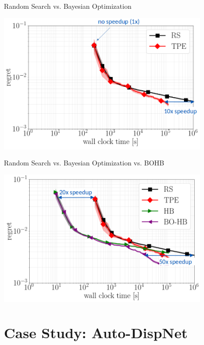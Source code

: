 \begin{frame}[c,fragile]{Random Search vs. Bayesian Optimization}

\centering
\includegraphics[width=0.8\textwidth]{images/randomsearch_bo}

\end{frame}
\begin{frame}[c,fragile]{Random Search vs. Bayesian Optimization vs. BOHB}

\centering
\includegraphics[width=0.8\textwidth]{images/randomsearch_bohb}

\end{frame}



\section{Case Study: Auto-DispNet}



